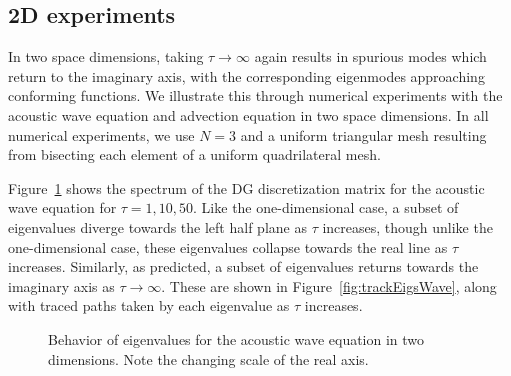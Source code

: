\documentclass[preprint,10pt]{elsarticle}
\newcommand{\note}[1]{#1}
\begin{document}
\subsection{2D experiments}

In two space dimensions, taking $\tau\rightarrow \infty$ again results in spurious modes which return to the imaginary axis, with the corresponding eigenmodes approaching conforming functions.  We illustrate this through numerical experiments with the acoustic wave equation and advection equation in two space dimensions.  In all numerical experiments, we use $N=3$ and a uniform triangular mesh resulting from bisecting each element of a uniform quadrilateral mesh.  

Figure~\ref{fig:waveeigs} shows the \note{spectrum} of the DG discretization matrix for the acoustic wave equation for $\tau = 1, 10, 50$.  Like the one-dimensional case, a subset of eigenvalues diverge towards the left half plane as $\tau$ increases, though unlike the one-dimensional case, these eigenvalues collapse towards the real line as $\tau$ increases.  Similarly, as predicted, a subset of eigenvalues returns towards the imaginary axis as $\tau \rightarrow \infty$.  These are shown in Figure~\ref{fig:trackEigsWave}, along with traced paths taken by each eigenvalue as $\tau$ increases.  

\begin{figure}
\centering
{}
\hspace{.5em}
\hspace{.5em}
\caption{Behavior of eigenvalues for the acoustic wave equation in two dimensions. Note the changing scale of the real axis.}
\label{fig:waveeigs}
\end{figure}
\end{document}
